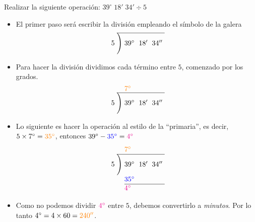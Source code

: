 \begin{example}
	Realizar la siguiente operación: $39^\circ\; 18'\; 34' \div 5$

	\begin{itemize}
		\item El primer paso será escribir la división empleando el símbolo de la 
		galera
		\begin{align*}
			\renewcommand\arraystretch{.75}\renewcommand\arraycolsep{3pt}
			\begin{array}{r@{\hskip\arraycolsep}c@{\hskip\arraycolsep}l*2r} %
				\cline{2-5} %
			5&\Bigg)&39^\circ&18'&34''
			\end{array}
		\end{align*}

		\item Para hacer la división dividimos cada término entre $5$, comenzado 
		por los grados.
		\begin{align*}
			\renewcommand\arraystretch{.75}\renewcommand\arraycolsep{3pt}
			\begin{array}{r@{\hskip\arraycolsep}c@{\hskip\arraycolsep}l*2r} %
				 &&\textcolor{orange}{7^\circ} & & \\
				\cline{2-5} %
			5&\Bigg)&39^\circ&18'&34''
			\end{array}
		\end{align*}

		\item Lo siguiente es hacer la operación al estilo de la ``primaria'', es 
		decir, $5 \times 7^\circ = \textcolor{orange}{35^\circ}$, entonces $39^\circ - 
		\textcolor{blue}{35^\circ}= \textcolor{magenta}{4^\circ}$
		\begin{align*}
			\renewcommand\arraystretch{1.05}\renewcommand\arraycolsep{3pt}
			\begin{array}{r@{\hskip\arraycolsep}c@{\hskip\arraycolsep}l*2r} %
				 &&\textcolor{orange}{7^\circ} & & \\
				\cline{2-5} %
			5&\Bigg)&39^\circ&18'&34''\\
			&& \textcolor{blue}{35^\circ} & & \\
			\cline{3-5} %
			&& \textcolor{magenta}{4^\circ} & &
			\end{array}
		\end{align*}

		\item Como no podemos dividir $\textcolor{magenta}{4^\circ}$  entre $5$, 
		debemos convertirlo a \textit{minutos}. Por lo tanto $4^\circ = 
		4 \times 60 = \textcolor{orange}{240''}$.


\end{itemize}
\end{example}
